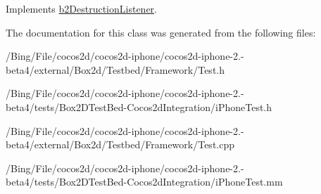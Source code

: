 Implements \hyperlink{classb2_destruction_listener_a6cd15baa6e5c33118cf7173ab5bf6d58}{b2\-Destruction\-Listener}.



The documentation for this class was generated from the following files\-:\begin{DoxyCompactItemize}
\item 
/\-Bing/\-File/cocos2d/cocos2d-\/iphone/cocos2d-\/iphone-\/2.-\/beta4/external/\-Box2d/\-Testbed/\-Framework/Test.\-h\item 
/\-Bing/\-File/cocos2d/cocos2d-\/iphone/cocos2d-\/iphone-\/2.-\/beta4/tests/\-Box2\-D\-Test\-Bed-\/\-Cocos2d\-Integration/i\-Phone\-Test.\-h\item 
/\-Bing/\-File/cocos2d/cocos2d-\/iphone/cocos2d-\/iphone-\/2.-\/beta4/external/\-Box2d/\-Testbed/\-Framework/Test.\-cpp\item 
/\-Bing/\-File/cocos2d/cocos2d-\/iphone/cocos2d-\/iphone-\/2.-\/beta4/tests/\-Box2\-D\-Test\-Bed-\/\-Cocos2d\-Integration/i\-Phone\-Test.\-mm\end{DoxyCompactItemize}
